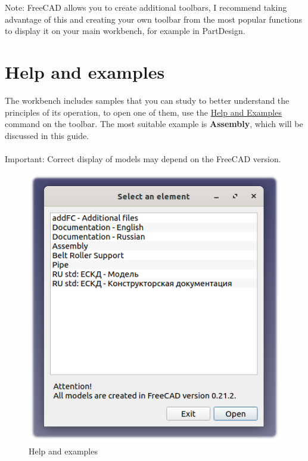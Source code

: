 \documentclass[a4paper,12pt]{article}
\begin{document}
Note: FreeCAD allows you to create additional toolbars, I recommend taking advantage of this and creating your own toolbar from the most popular functions to display it on your main workbench, for example in PartDesign.

\pagebreak




\section{Help and examples}

The workbench includes samples that you can study to better understand the principles of its operation, to open one of them, use the \hyperref[sec:10]{Help and Examples} command on the toolbar.
The most suitable example is \textbf{Assembly}, which will be discussed in this guide.\\\\
Important: Correct display of models may depend on the FreeCAD version.

\begin{figure}[htp]
	\centering
	\includegraphics[scale=1]{img/assistant.png}
	\caption{Help and examples}
	\label{sec:assistant}
\end{figure}
\end{document}
